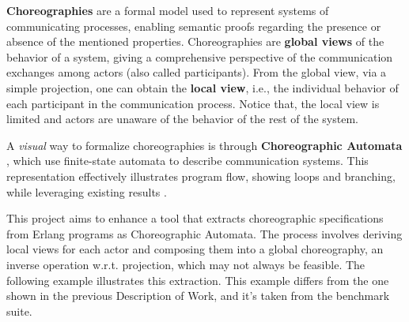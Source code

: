 \textbf{Choreographies} are a formal model used to 
represent systems of communicating processes, enabling semantic proofs 
regarding the presence or absence of the mentioned properties. Choreographies 
are \textbf{global views} of the behavior of a system, giving a comprehensive 
perspective of the communication exchanges among actors (also called 
participants). From the global view, via a simple projection, one can obtain 
the \textbf{local view}, i.e., the individual behavior of each participant in 
the communication process. Notice that, the local view is limited and actors 
are unaware of the behavior of the rest of the system.

A \textit{visual} way to formalize choreographies is through 
\textbf{Choreographic Automata} \cite{coordination2020-chorAuto}, which use 
finite-state automata to describe communication systems. This representation 
effectively illustrates program flow, showing loops and branching, while 
leveraging existing results \cite{orlando2021corinne}.

This project aims to enhance a tool that extracts choreographic specifications 
from Erlang programs as Choreographic Automata. The process involves deriving 
local views for each actor and composing them into a global choreography, an 
inverse operation w.r.t. projection, which may not always be feasible. The 
following example illustrates this extraction. This example differs from the
one shown in the previous Description of Work, and it's taken from the benchmark
suite.

